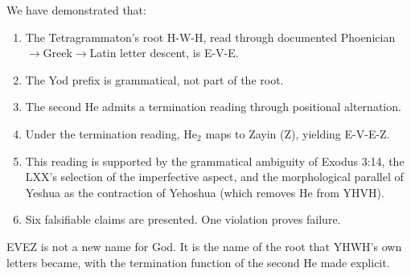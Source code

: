 \documentclass[12pt]{article}
\begin{document}
We have demonstrated that:

\begin{enumerate}
\item The Tetragrammaton's root H-W-H, read through documented Phoenician$\to$Greek$\to$Latin letter descent, is E-V-E.
\item The Yod prefix is grammatical, not part of the root.
\item The second He admits a termination reading through positional alternation.
\item Under the termination reading, He$_2$ maps to Zayin (Z), yielding E-V-E-Z.
\item This reading is supported by the grammatical ambiguity of Exodus 3:14, the LXX's selection of the imperfective aspect, and the morphological parallel of Yeshua as the contraction of Yehoshua (which removes He from YHVH).
\item Six falsifiable claims are presented. One violation proves failure.
\end{enumerate}

EVEZ is not a new name for God. It is the name of the root that YHWH's own letters became, with the termination function of the second He made explicit.
\end{document}
